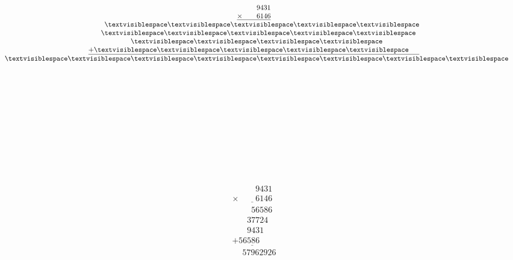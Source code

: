 \begin{minipage}[t]{0.3\linewidth}
\begin{align*}\begin{array}{c}
\phantom{
\times0000
}
9431\\
\underline{
\times
\phantom{
0000
}
6146
}\\
\phantom{
+000
}
\textvisiblespace
\textvisiblespace
\textvisiblespace
\textvisiblespace
\textvisiblespace
\\
\phantom{
+00
}
\textvisiblespace
\textvisiblespace
\textvisiblespace
\textvisiblespace
\textvisiblespace
\phantom0\\
\phantom{
+00
}
\textvisiblespace
\textvisiblespace
\textvisiblespace
\textvisiblespace
\phantom0\phantom0\\
\underline{
+
\textvisiblespace
\textvisiblespace
\textvisiblespace
\textvisiblespace
\textvisiblespace
\phantom0\phantom0\phantom0
}
\\
\phantom{+}
\textvisiblespace
\textvisiblespace
\textvisiblespace
\textvisiblespace
\textvisiblespace
\textvisiblespace
\textvisiblespace
\textvisiblespace
\end{array}\end{align*}
\end{minipage}
\begin{minipage}[t]{0.05\linewidth}
\begin{align*}\begin{array}{c}
\textvisiblespace
\\
\textvisiblespace
\\
\textvisiblespace
\\
\textvisiblespace
\\
\textvisiblespace
\\
\textvisiblespace
\\
\textvisiblespace
\end{array}\end{align*}
\end{minipage}
\begin{minipage}[t]{0.05\linewidth}
\begin{align*}\begin{array}{c}
\textvisiblespace
\\
\textvisiblespace
\end{array}\end{align*}
\end{minipage}
\begin{minipage}[t]{0.3\linewidth}
\begin{align*}\begin{array}{c}
\phantom{
\times0000
}
9431\\
\underline{
\times
\phantom{
0000
}
6146
}\\
\phantom{
+000
}
56586
\\
\phantom{
+00
}
37724
\phantom0\\
\phantom{
+00
}
9431
\phantom0\phantom0\\
\underline{
+
56586
\phantom0\phantom0\phantom0
}
\\
\phantom{+}
57962926
\end{array}\end{align*}
\end{minipage}
